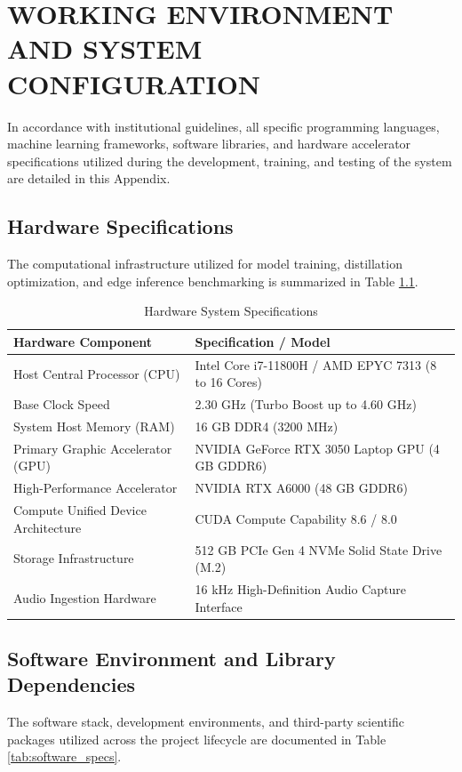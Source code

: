 \chapter{WORKING ENVIRONMENT AND SYSTEM CONFIGURATION}
\label{app:environment}

In accordance with institutional guidelines, all specific programming languages, machine learning frameworks, software libraries, and hardware accelerator specifications utilized during the development, training, and testing of the system are detailed in this Appendix.

\section{Hardware Specifications}
The computational infrastructure utilized for model training, distillation optimization, and edge inference benchmarking is summarized in Table \ref{tab:hardware_specs}.

\begin{table}[htbp]
\centering
\caption{Hardware System Specifications}
\label{tab:hardware_specs}
\begin{tabular}{ll}
\toprule
\textbf{Hardware Component} & \textbf{Specification / Model} \\
\midrule
Host Central Processor (CPU) & Intel Core i7-11800H / AMD EPYC 7313 (8 to 16 Cores) \\
Base Clock Speed & 2.30 GHz (Turbo Boost up to 4.60 GHz) \\
System Host Memory (RAM) & 16 GB DDR4 (3200 MHz) \\
Primary Graphic Accelerator (GPU) & NVIDIA GeForce RTX 3050 Laptop GPU (4 GB GDDR6) \\
High-Performance Accelerator & NVIDIA RTX A6000 (48 GB GDDR6) \\
Compute Unified Device Architecture & CUDA Compute Capability 8.6 / 8.0 \\
Storage Infrastructure & 512 GB PCIe Gen 4 NVMe Solid State Drive (M.2) \\
Audio Ingestion Hardware & 16 kHz High-Definition Audio Capture Interface \\
\bottomrule
\end{tabular}
\end{table}

\section{Software Environment and Library Dependencies}
The software stack, development environments, and third-party scientific packages utilized across the project lifecycle are documented in Table \ref{tab:software_specs}.


